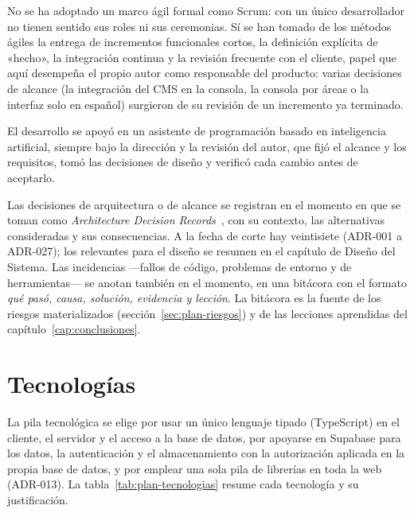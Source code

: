 No se ha adoptado un marco ágil formal como Scrum: con un único desarrollador
no tienen sentido sus roles ni sus ceremonias. Sí se han tomado de los métodos
ágiles la entrega de incrementos funcionales cortos, la definición explícita
de «hecho», la integración continua y la revisión frecuente con el cliente,
papel que aquí desempeña el propio autor como responsable del producto: varias
decisiones de alcance (la integración del CMS en la consola, la consola por
áreas o la interfaz solo en español) surgieron de su revisión de un incremento
ya terminado.

El desarrollo se apoyó en un asistente de programación basado en inteligencia
artificial, siempre bajo la dirección y la revisión del autor, que fijó el
alcance y los requisitos, tomó las decisiones de diseño y verificó cada cambio
antes de aceptarlo.

Las decisiones de arquitectura o de alcance se registran en el momento en que
se toman como \textit{Architecture Decision Records}~\cite{nygard2011adr},
con su contexto, las alternativas consideradas y sus consecuencias. A la fecha
de corte hay veintisiete (ADR-001 a ADR-027); los relevantes para el diseño se
resumen en el capítulo de Diseño del Sistema. Las incidencias ---fallos
de código, problemas de entorno y de herramientas--- se anotan
también en el momento, en una bitácora con el formato \emph{qué pasó, causa,
solución, evidencia y lección}. La bitácora es la fuente de los riesgos
materializados (sección~\ref{sec:plan-riesgos}) y de las lecciones aprendidas
del capítulo~\ref{cap:conclusiones}.

\section{Tecnologías}
\label{sec:plan-tecnologias}

La pila tecnológica se elige por usar un único lenguaje tipado (TypeScript) en
el cliente, el servidor y el acceso a la base de datos, por apoyarse en
Supabase para los datos, la autenticación y el almacenamiento con la
autorización aplicada en la propia base de datos, y por emplear una sola pila
de librerías en toda la web (ADR-013). La tabla~\ref{tab:plan-tecnologias} resume cada
tecnología y su justificación.

